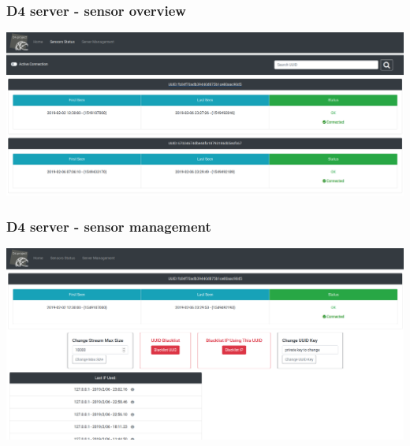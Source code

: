 \documentclass{beamer}
\begin{document}
\begin{frame}
        \frametitle{D4 server - sensor overview}
        \includegraphics[scale=0.18]{d4-1.png}
\end{frame}


\begin{frame}
        \frametitle{D4 server - sensor management}
        \includegraphics[scale=0.18]{d4-2.png}
\end{frame}
\end{document}
